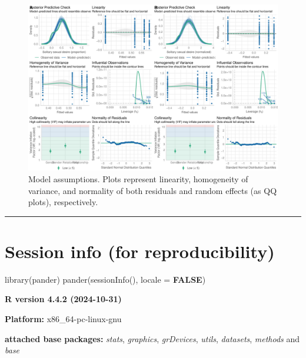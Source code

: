 \documentclass[
  bookmarksnumbered]{article}
\newenvironment{Shaded}{\begin{snugshade}}{\end{snugshade}}
\newcommand{\AttributeTok}[1]{\textcolor[rgb]{0.80,0.80,0.80}{#1}}
\newcommand{\ConstantTok}[1]{\textcolor[rgb]{0.86,0.64,0.64}{\textbf{#1}}}
\newcommand{\FunctionTok}[1]{\textcolor[rgb]{0.94,0.94,0.56}{#1}}
\newcommand{\NormalTok}[1]{\textcolor[rgb]{0.80,0.80,0.80}{#1}}
\begin{document}
\begin{figure}
\centering
\includegraphics{Sexual_Desire_Arousal_V2_files/figure-latex/assu-m1-1.pdf}
\caption{\label{fig:assu-m1}Model assumptions. Plots represent linearity, homogeneity of variance, and normality of both residuals and random effects (as QQ plots), respectively.}
\end{figure}

\begin{center}\rule{0.5\linewidth}{0.5pt}\end{center}

\section{Session info (for reproducibility)}\label{session}

\begin{Shaded}
\begin{Highlighting}[]
\FunctionTok{library}\NormalTok{(pander)}
\FunctionTok{pander}\NormalTok{(}\FunctionTok{sessionInfo}\NormalTok{(), }\AttributeTok{locale =} \ConstantTok{FALSE}\NormalTok{)}
\end{Highlighting}
\end{Shaded}

\textbf{R version 4.4.2 (2024-10-31)}

\textbf{Platform:} x86\_64-pc-linux-gnu

\textbf{attached base packages:}
\emph{stats}, \emph{graphics}, \emph{grDevices}, \emph{utils}, \emph{datasets}, \emph{methods} and \emph{base}
\end{document}
